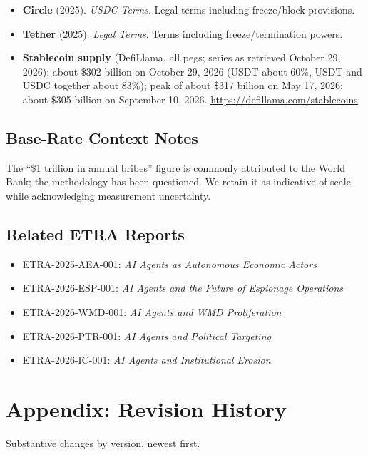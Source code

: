 \documentclass[11pt,letterpaper]{article}
\begin{document}
\begin{itemize}[leftmargin=1.5em]
  \item \textbf{Circle} (2025). \textit{USDC Terms}. Legal terms including freeze/block provisions.
  \item \textbf{Tether} (2025). \textit{Legal Terms}. Terms including freeze/termination powers.
  \item \textbf{Stablecoin supply} (DefiLlama, all pegs; series as retrieved October 29, 2026): about \$302 billion on October 29, 2026 (USDT about 60\%, USDT and USDC together about 83\%); peak of about \$317 billion on May 17, 2026; about \$305 billion on September 10, 2026. \url{https://defillama.com/stablecoins}
\end{itemize}

\subsection*{Base-Rate Context Notes}

The ``\$1 trillion in annual bribes'' figure is commonly attributed to the World Bank; the methodology has been questioned. We retain it as indicative of scale while acknowledging measurement uncertainty.

\subsection*{Related ETRA Reports}

\begin{itemize}[leftmargin=1.5em]
  \item ETRA-2025-AEA-001: \textit{AI Agents as Autonomous Economic Actors}
  \item ETRA-2026-ESP-001: \textit{AI Agents and the Future of Espionage Operations}
  \item ETRA-2026-WMD-001: \textit{AI Agents and WMD Proliferation}
  \item ETRA-2026-PTR-001: \textit{AI Agents and Political Targeting}
  \item ETRA-2026-IC-001: \textit{AI Agents and Institutional Erosion}
\end{itemize}

\clearpage
\section*{Appendix: Revision History}
\label{sec:history}

Substantive changes by version, newest first.
\end{document}
